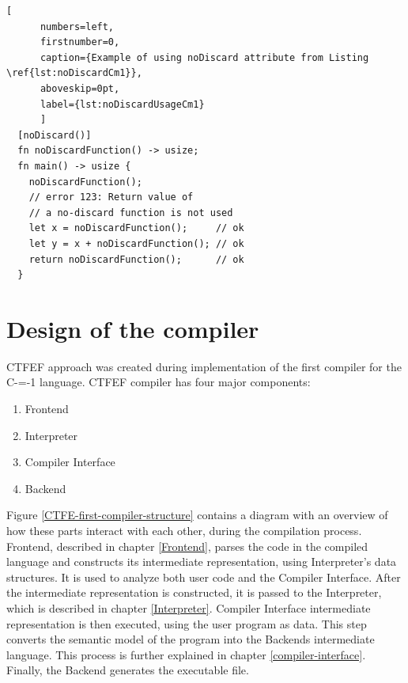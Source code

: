 \begin{minipage}{\linewidth}

	\begin{lstlisting}[
	  numbers=left,
	  firstnumber=0,
	  caption={Example of using noDiscard attribute from Listing \ref{lst:noDiscardCm1}},
	  aboveskip=0pt,
	  label={lst:noDiscardUsageCm1}
	  ]
  [noDiscard()]
  fn noDiscardFunction() -> usize;
  fn main() -> usize {
	noDiscardFunction();
	// error 123: Return value of
	// a no-discard function is not used
	let x = noDiscardFunction();     // ok
	let y = x + noDiscardFunction(); // ok
	return noDiscardFunction();      // ok
  }
  \end{lstlisting}
\end{minipage}

\section{Design of the compiler}
\label{compiler-design}

CTFEF approach was created during implementation of the first compiler for the C-=-1 language\cite{grabski2022compilation}.
CTFEF compiler has four major components:
\begin{enumerate}
	\item Frontend
	\item Interpreter
	\item Compiler Interface
	\item Backend
\end{enumerate}

Figure \ref{CTFE-first-compiler-structure} contains a diagram with an overview of how these parts interact with each other, during the compilation process.
Frontend, described in chapter \ref{Frontend}, parses the code in the compiled language and constructs its intermediate representation, using Interpreter's data structures.
It is used to analyze both user code and the Compiler Interface.
After the intermediate representation is constructed, it is passed to the Interpreter, which is described in chapter \ref{Interpreter}.
Compiler Interface intermediate representation is then executed, using the user program as data.
This step converts the semantic model of the program into the Backends intermediate language.
This process is further explained in chapter \ref{compiler-interface}.
Finally, the Backend generates the executable file.

